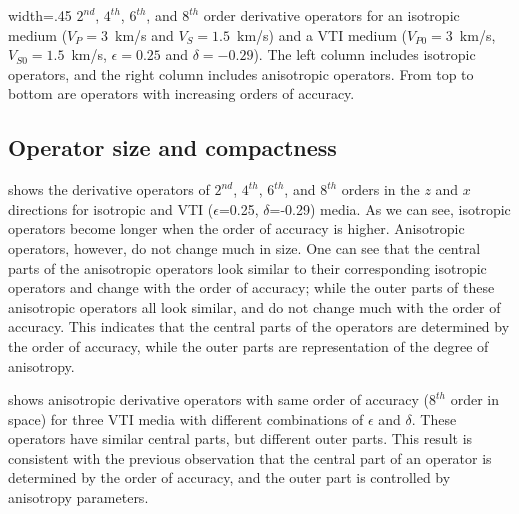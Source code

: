 {width=.45\textwidth} { $2^{nd}$, $4^{th}$, $6^{th}$, and $8^{th}$
order derivative operators for an isotropic medium ($V_P=3$~km/s and
$V_S=1.5$~km/s) and a VTI medium ($V_{P0}=3$~km/s, $V_{S0}=1.5$~km/s,
$\epsilon=0.25$ and $\delta=-0.29$). The left column includes
isotropic operators, and the right column includes anisotropic
operators.  From top to bottom are operators with increasing orders of
accuracy.}


\subsection{Operator size and compactness}
 shows the derivative
operators of $2^{nd}$, $4^{th}$, $6^{th}$, and $8^{th}$ orders in the
$z$ and $x$ directions for isotropic and VTI ($\epsilon$=0.25,
$\delta$=-0.29) media. As we can see,
isotropic operators become longer when the order of accuracy is
higher. Anisotropic operators, however, do not change much in size. One
can see that the central parts of the anisotropic operators look similar
to their corresponding isotropic operators and change with the order
of accuracy; while the outer parts of these anisotropic operators all
look similar, and do not change much with the order of accuracy. This
indicates that the central parts of the operators are determined by
the order of accuracy, while the outer parts are representation of the
degree of anisotropy.

shows anisotropic derivative operators with 
same order of accuracy ($8^{th}$ order in space) for three VTI media
with different combinations of $\epsilon$ and $\delta$. These
operators have similar central parts, but different outer parts.  This
result is consistent with the previous observation that the central
part of an operator is determined by the order of accuracy, and the
outer part is controlled by anisotropy parameters. 


